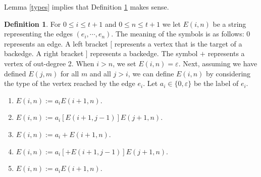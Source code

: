 \documentclass[12pt]{article}
\newcommand{\eps}{\varepsilon}
\theoremstyle{plain}
\theoremstyle{definition}
\newtheorem{df}[thm]{Definition}
\theoremstyle{remark}
\begin{document}
			Lemma \ref{types} implies that Definition \ref{def:E} makes sense.
			\begin{df}\label{def:E}
				For $0\le i\le t+1$ and $0\le n\le t+1$ we let $E(i,n)$ be a string representing the edges $(e_i, \cdots, e_n)$.
				The meaning of the symbols is as follows: 0 represents an edge.
				A left bracket $[$ represents a vertex that is the target of a backedge.
				A right bracket $]$ represents a backedge.
				The symbol $+$ represents a vertex of out-degree 2.
				When $i>n$, we set $E(i,n)=\eps$.
				Next, assuming we have defined $E(j,m)$ for all $m$ and all $j>i$,
				we can define $E(i,n)$ by considering the type of the vertex reached by the edge $e_i$.
				Let $a_i\in\{0,\eps\}$ be the label of $e_i$.
				\begin{enumerate}
					\item{} $E(i,n) := a_i E(i+1,n)$.
					\item{} $E(i,n) := a_i [ E(i+1,j-1)] E(j+1,n)$.
					\item{} $E(i,n) := a_i + E(i+1,n)$.
					\item{} $E(i,n) := a_i [+E(i+1,j-1)] E(j+1,n)$.
					\item{} $E(i,n) := a_i E(i+1,n)$.
				\end{enumerate}
			\end{df}
\end{document}
